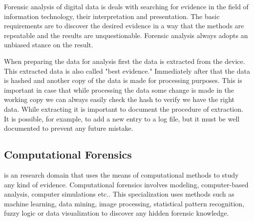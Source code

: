
Forensic analysis of digital data is deals with searching for evidence in the field of information technology, their interpretation and presentation. The basic requirements are to discover the desired evidence in a way that the methods are repeatable and the results are unquestionable. Forensic analysis always adopts an unbiased stance on the result.

When preparing the data for analysis first the data is extracted from the device. This extracted data is also called "best evidence." Immediately after that the data is hashed and another copy of the data is made for processing purposes. This is important in case that while processing the data some change is made in the working copy we can always easily check the hash to verify we have the right data. While extracting it is important to document the procedure of extraction. It is possible, for example, to add a new entry to a log file, but it must be well documented to prevent any future mistake.


%
%
%
%
%
%
% 	

\subsection{Computational Forensics} is an research domain that uses the means of computational methods to study any kind of evidence. Computational forensics involves modeling, computer-based analysis, computer simulations etc.. This specialization uses methods such as machine learning, data mining, image processing, statistical pattern recognition, fuzzy logic or data visualization to discover any hidden forensic knowledge. 


